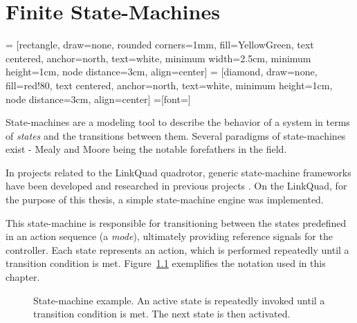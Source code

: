 \chapter{Finite State-Machines}
\label{cha:logic}
     = [rectangle, draw=none, rounded corners=1mm, fill=YellowGreen,
                    text centered, anchor=north, text=white, minimum width=2.5cm, minimum height=1cm, node distance=3cm, align=center]
     = [diamond, draw=none, fill=red!80,
                    text centered, anchor=north, text=white, minimum height=1cm, node distance=3cm, align=center]
    =[font=\scriptsize]

    State-machines are a modeling tool to describe the behavior of a system
    in terms of \textit{states} and the transitions between them.
    Several paradigms of state-machines exist - Mealy and Moore being the notable forefathers in the field.

    In projects related to the LinkQuad quadrotor, generic state-machine
    frameworks have been developed and researched in previous projects \citep{Merz06,Wzorek11}.
    On the LinkQuad, for the purpose of this thesis, a simple state-machine engine
    was implemented.%

    This state-machine is responsible for transitioning between the
    states predefined in an action sequence (a \textit{mode}), ultimately
    providing reference signals for the controller.
    Each state represents an action, which is performed repeatedly until
    a transition condition is met.
    Figure~\ref{fig:logic:statemachine} exemplifies the notation used in this chapter.

    \begin{figure}[H]
        \noindent{}
        \caption{State-machine example. An active state is repeatedly invoked until a transition condition is met. The next state is then activated.}
        \label{fig:logic:statemachine}
    \end{figure}

